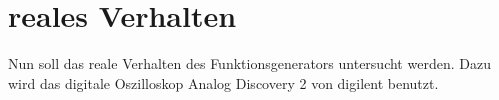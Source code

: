 \section{reales Verhalten}
Nun soll das reale Verhalten des Funktionsgenerators untersucht werden.
Dazu wird das digitale Oszilloskop Analog Discovery 2 von digilent benutzt.


